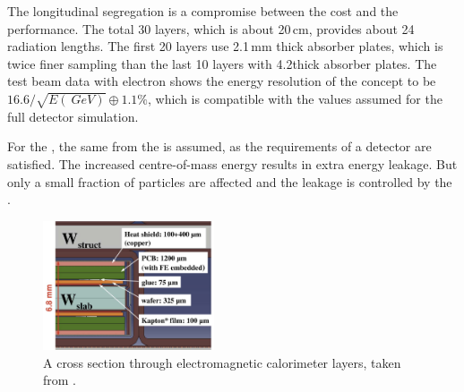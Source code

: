 The longitudinal segregation is a compromise between the cost and the performance. The total 30 layers, which is about 20\,cm, provides about 24 radiation lengths. The first 20 layers use 2.1\,mm thick absorber plates, which is twice finer sampling than the last 10 layers with 4.2\mm thick absorber plates. The test beam data with electron shows the energy resolution of the \ECAL concept to be $16.6/\sqrt{E(\ GeV)}\oplus1.1\%$, which is compatible with the values assumed for the full \ILD detector simulation.

For the \CLICILD, the same \ECAL from the \ILD is assumed, as the requirements of a \CLIC detector are satisfied. The increased centre-of-mass energy results in extra energy leakage. But only a small fraction of particles are affected and the leakage is controlled by the \HCAL.

\begin{figure}[tdbph]
\centering
\includegraphics[width=0.45\textwidth]{ILD/ILD_ECAL}
\caption[]
{A cross section through electromagnetic calorimeter layers, taken from \cite{Baer:2013cma}.}
\label{fig:detectorILDECAL}
\end{figure}


